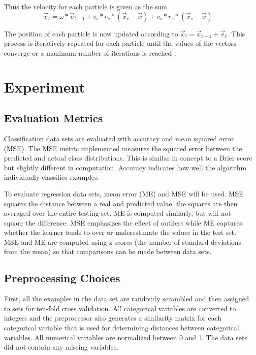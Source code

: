 \documentclass[twoside,11pt]{article}
\begin{document}
	Thus the velocity for each particle is given as the sum
	$$\vec{v}_t = \omega * \vec{v}_{t-1} + c_c*r_c*(\vec{x}_c - \vec{x}) + c_s*r_s*(\vec{x}_s - \vec{x})$$
	
	The position of each particle is now updated according to $\vec{x}_t = \vec{x}_{t-1} + \vec{v}_t$. This process is iteratively repeated for each particle until the values of the vectors converge or a maximum number of iterations is reached \citep{og-pso}.
		
\section{Experiment}

\subsection{Evaluation Metrics}

	Classification data sets are evaluated with accuracy and mean squared error (MSE). 
	The MSE metric implemented measures the squared error between the predicted and actual class distributions. 
	This is similar in concept to a Brier score but slightly different in computation. Accuracy indicates how well the algorithm individually classifies examples.
	
	To evaluate regression data sets, mean error (ME) and MSE will be used. MSE squares the distance between a real and predicted value, the squares are then averaged over the entire testing set. 
	ME is computed similarly, but will not square the difference. MSE emphasizes the effect of outliers while ME captures whether the learner tends to over or underestimate the values in the test set. 
	MSE and ME are computed using z-scores (the number of standard deviations from the mean) so that comparisons can be made between data sets.

\subsection{Preprocessing Choices}

	First, all the examples in the data set are randomly scrambled and then assigned to sets for ten-fold cross validation. 
	All categorical variables are converted to integers 
	and the preprocessor also generates a similarity matrix for each categorical variable that is used for determining distances between categorical variables. 
	All numerical variables are normalized between 0 and 1. 
	The data sets did not contain any missing variables.
\end{document}
